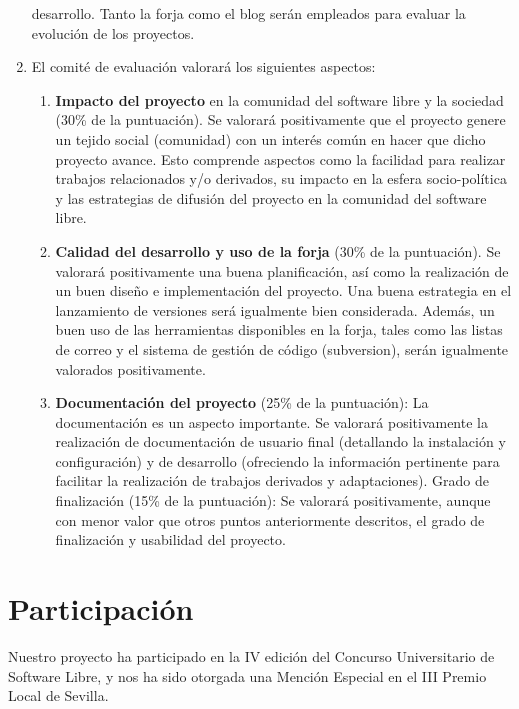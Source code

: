 \begin{enumerate}
desarrollo. Tanto la forja como el blog serán empleados para evaluar la
evolución de los proyectos.
\item El comité de evaluación valorará los siguientes aspectos:
    \begin{enumerate}
    \item {\bf Impacto del proyecto} en la comunidad del software libre y la
    sociedad (30\% de la puntuación). Se valorará positivamente que el proyecto
    genere un tejido social (comunidad) con un interés común en hacer que dicho
    proyecto avance. Esto comprende aspectos como la facilidad para realizar
    trabajos relacionados y/o derivados, su impacto en la esfera socio-política
    y las estrategias de difusión del proyecto en la comunidad del software
    libre.
    \item {\bf Calidad del desarrollo y uso de la forja} (30\% de la
    puntuación). Se valorará positivamente una buena planificación, así como la
    realización de un buen diseño e implementación del proyecto. Una buena
    estrategia en el lanzamiento de versiones será igualmente bien considerada.
    Además, un buen uso de las herramientas disponibles en la forja, tales como
    las listas de correo y el sistema de gestión de código (subversion), serán
    igualmente valorados positivamente.
    \item {\bf Documentación del proyecto} (25\% de la puntuación): La
    documentación es un aspecto importante. Se valorará positivamente la
    realización de documentación de usuario final (detallando la instalación y
    configuración) y de desarrollo (ofreciendo la información pertinente para
    facilitar la realización de trabajos derivados y adaptaciones).
    Grado de finalización (15\% de la puntuación): Se valorará positivamente,
    aunque con menor valor que otros puntos anteriormente descritos, el grado de
    finalización y usabilidad del proyecto.
    \end{enumerate}
\end{enumerate}

\section{Participación}

Nuestro proyecto ha participado en la IV edición del Concurso Universitario de
Software Libre, y nos ha sido otorgada una Mención Especial en el III Premio
Local de Sevilla.